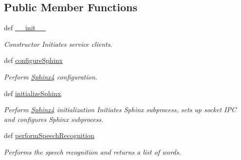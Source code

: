 \subsection*{Public Member Functions}
\begin{DoxyCompactItemize}
\item 
def \hyperlink{classrapp__speech__detection__sphinx4_1_1sphinx4__wrapper_1_1Sphinx4Wrapper_a540295a971600831c3b36968c32ad842}{\-\_\-\-\_\-init\-\_\-\-\_\-}
\begin{DoxyCompactList}\small\item\em Constructor Initiates service clients. \end{DoxyCompactList}\item 
def \hyperlink{classrapp__speech__detection__sphinx4_1_1sphinx4__wrapper_1_1Sphinx4Wrapper_a0629ff048d1714cc7fe581a39375afc5}{configure\-Sphinx}
\begin{DoxyCompactList}\small\item\em Perform \hyperlink{classSphinx4}{Sphinx4} configuration. \end{DoxyCompactList}\item 
def \hyperlink{classrapp__speech__detection__sphinx4_1_1sphinx4__wrapper_1_1Sphinx4Wrapper_a9577435dcbae5622e390c5b5441be0e7}{initialize\-Sphinx}
\begin{DoxyCompactList}\small\item\em Perform \hyperlink{classSphinx4}{Sphinx4} initialization Initiates Sphinx subprocess, sets up socket I\-P\-C and configures Sphinx subprocess. \end{DoxyCompactList}\item 
def \hyperlink{classrapp__speech__detection__sphinx4_1_1sphinx4__wrapper_1_1Sphinx4Wrapper_af43486249bab4de044fdccb7d43e8966}{perform\-Speech\-Recognition}
\begin{DoxyCompactList}\small\item\em Performs the speech recognition and returns a list of words. \end{DoxyCompactList}\end{DoxyCompactItemize}
